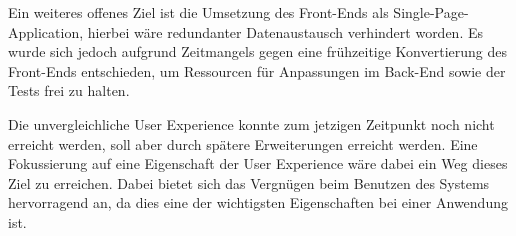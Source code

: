 Ein weiteres offenes Ziel ist die Umsetzung des Front-Ends als Single-Page-Application, hierbei wäre redundanter Datenaustausch verhindert worden.
Es wurde sich jedoch aufgrund Zeitmangels gegen eine frühzeitige Konvertierung des Front-Ends entschieden, um Ressourcen für Anpassungen im Back-End sowie der Tests frei zu halten.

Die unvergleichliche User Experience konnte zum jetzigen Zeitpunkt noch nicht erreicht werden, soll aber durch spätere Erweiterungen erreicht werden. 
Eine Fokussierung auf eine Eigenschaft der User Experience wäre dabei ein Weg dieses Ziel zu erreichen.
Dabei bietet sich das Vergnügen beim Benutzen des Systems hervorragend an, da dies eine der wichtigsten Eigenschaften bei einer Anwendung ist.
